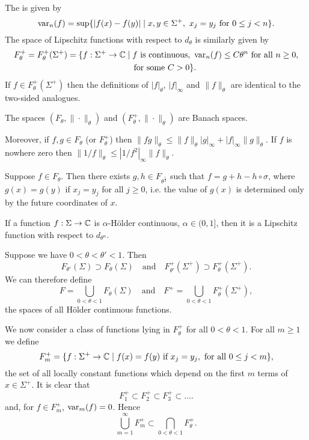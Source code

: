 The  is given by
\[
	\operatorname{var}_n(f) = \sup\{|f(x) - f(y)| \mid x, y \in \Sigma^+,\ x_j = y_j \text{ for } 0 \leq j < n\}.
\]
The space of Lipschitz functions with respect to $d_\theta$ is similarly given by
\begin{align*}
	F_\theta^+ = F_\theta^+(\Sigma^+) = \{f : \Sigma^+ \to \mathbb{C} &\mid f \text{ is continuous}, \ \operatorname{var}_n(f) \leq C\theta^n \text{ for all } n \geq 0, \\
			& \quad \text{for some } C > 0\}.
\end{align*}
If $f \in F_\theta^+(\Sigma^+)$ then the definitions of $|f|_\theta$, $|f|_\infty$ and $\|f\|_\theta$ are identical to the two-sided analogues.

\begin{proposition}
	The spaces $(F_\theta, \|\cdot\|_\theta)$ and $(F_\theta^+, \|\cdot\|_\theta)$ are Banach spaces.
	
	Moreover, if $f, g \in F_\theta$ (or $F_\theta^+$) then $\|fg\|_\theta \leq \|f\|_\theta |g|_\infty + |f|_\infty \|g\|_\theta$. If $f$ is nowhere zero then $\|1 / f\|_\theta \leq |1 / f^2|_\infty \|f\|_\theta$.
\end{proposition}

\begin{proposition}
	Suppose $f \in F_\theta$. Then there exists $g, h \in F_{\theta^{\frac{1}{2}}}$ such that $f = g + h - h \circ \sigma$, where $g(x) = g(y)$ if $x_j = y_j$ for all $j \geq 0$, i.e. the value of $g(x)$ is determined only by the future coordinates of $x$.
\end{proposition}

If a function $f : \Sigma \to \mathbb{C}$ is $\alpha$-H\"older continuous, $\alpha \in (0, 1]$, then it is a Lipschitz function with respect to $d_{\theta^\alpha}$.

Suppose we have $0 < \theta < \theta' < 1$. Then
\[
	F_{\theta'}(\Sigma) \supset F_\theta(\Sigma) \quad \text{and} \quad F_{\theta'}^+(\Sigma^+) \supset F_\theta^+(\Sigma^+).
\]
We can therefore define
\[
	F = \bigcup_{0 < \theta < 1}{F_\theta(\Sigma)} \quad \text{and} \quad F^+ = \bigcup_{0 < \theta < 1}{F_\theta^+(\Sigma^+)},
\]
the spaces of all H\"older continuous functions.

We now consider a class of functions lying in $F_\theta^+$ for all $0 < \theta < 1$. For all $m \geq 1$ we define
\[
	F_m^+ = \{f : \Sigma^+ \to \mathbb{C} \mid f(x) = f(y) \text{ if } x_j = y_j, \text{ for all } 0 \leq j < m\},
\]
the set of all locally constant functions which depend on the first $m$ terms of $x \in \Sigma^+$. It is clear that
\[
	F_1^+ \subset F_2^+ \subset F_3^+ \subset \dots.
\]
and, for $f \in F_m^+$, $\operatorname{var}_m(f) = 0$. Hence
\[
	\bigcup_{m = 1}^\infty{F_m^+} \subset \bigcap_{0 < \theta < 1}{F_\theta^+}.
\]

